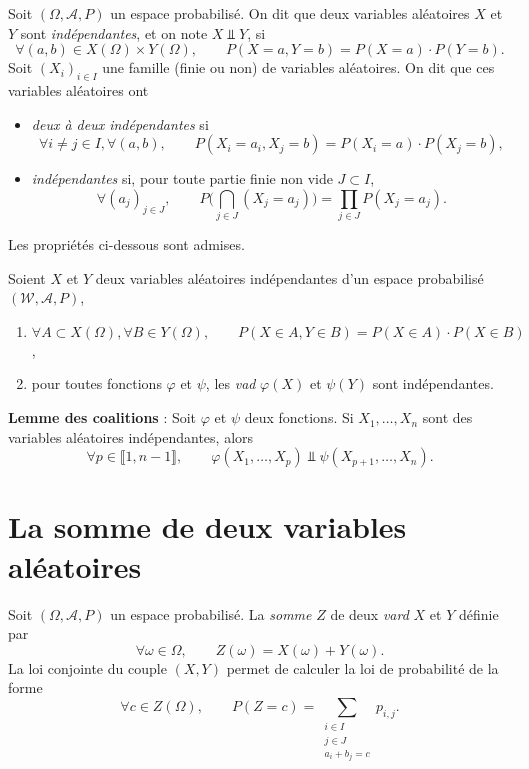 \begin{defn}
	Soit $(\Omega, \mathcal{A}, P)$ un espace probabilisé. On dit que deux variables aléatoires $X$ et $Y$ sont \textit{indépendantes}, et on note $X \mathrel{\Bot} Y$, si \[
		\forall (a, b) \in X(\Omega) \times Y(\Omega), \quad\quad P(X = a, Y = b) = P(X = a) \cdot P(Y = b)
	.\]
	Soit $(X_i)_{i\in I}$\/ une famille (finie ou non) de variables aléatoires. On dit que ces variables aléatoires ont
	\begin{itemize}
		\item \textit{deux à deux indépendantes} si \[
			\forall i \neq j \in I,\forall (a,b),\quad\quad P(X_i = a_i, X_j = b) = P(X_i = a) \cdot P(X_j = b)
			,\]
		\item \textit{indépendantes} si, pour toute partie finie non vide $J \subset I$, \[
				\forall (a_j)_{j\in J}, \quad\quad P\Big(\bigcap_{j \in J} (X_j = a_j)\Big) = \prod_{j \in J} P(X_j = a_j)
		.\]
	\end{itemize}
\end{defn}

Les propriétés ci-dessous sont admises.
\begin{prop}
	Soient $X$ et $Y$ deux variables aléatoires indépendantes d'un espace probabilisé $(\mathcal{W}, \mathcal{A}, P)$,
	\begin{enumerate}
		\item $\forall A \subset X(\Omega), \forall B \in Y(\Omega),\quad\quad P(X \in A, Y \in B) = P(X \in A) \cdot P(X \in B)$,
		\item pour toutes fonctions $\varphi$ et $\psi$, les \textit{vad} $\varphi(X)$ et $\psi(Y)$ sont indépendantes.
	\end{enumerate}

	\textbf{Lemme des coalitions} :
	Soit $\varphi$\/ et $\psi$ deux fonctions.
	Si $X_1, \ldots, X_n$ sont des variables aléatoires indépendantes, alors \[
		\forall p \in \llbracket 1,n-1 \rrbracket,\quad\quad \varphi(X_1, \ldots, X_p) \mathrel{\Bot} \psi(X_{p+1}, \ldots, X_n)
	.\]
\end{prop}


\section{La somme de deux variables aléatoires}

Soit $(\Omega, \mathcal{A}, P)$ un espace probabilisé. La \textit{somme} $Z$ de deux \textit{vard} $X$ et $Y$ définie par \[
	\forall \omega \in \Omega, \quad\quad Z(\omega) = X(\omega) + Y(\omega)
.\]
La loi conjointe du couple $(X, Y)$ permet de calculer la loi de probabilité de la forme \[
	\forall c \in Z(\Omega), \quad\quad P(Z = c) = \sum_{\substack{i\in I\\j \in J\\ a_i + b_j = c}} p_{i,j}
.\]

